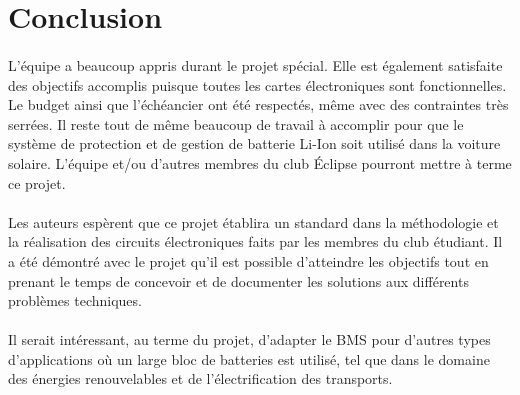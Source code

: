 \section{Conclusion}

	\paragraph{}
	L'équipe a beaucoup appris durant le projet spécial. Elle est également satisfaite des objectifs accomplis puisque toutes les cartes électroniques sont fonctionnelles. Le budget ainsi que l'échéancier ont été respectés, même avec des contraintes très serrées. Il reste tout de même beaucoup de travail à accomplir pour que le système de protection et de gestion de batterie Li-Ion soit utilisé dans la voiture solaire. L'équipe et/ou d'autres membres du club Éclipse pourront mettre à terme ce projet.
	
	\paragraph{}
	 Les auteurs espèrent que ce projet établira un standard dans la méthodologie et la réalisation des circuits électroniques faits par les membres du club étudiant. Il a été démontré avec le projet qu'il est possible d'atteindre les objectifs tout en prenant le temps de concevoir et de documenter les solutions aux différents problèmes techniques. 

	\paragraph{}	
	Il serait intéressant, au terme du projet, d'adapter le BMS pour d'autres types d'applications où un large bloc de batteries est utilisé, tel que dans le domaine des énergies renouvelables et de l'électrification des transports. 